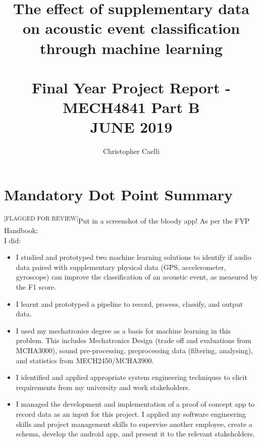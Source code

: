 \documentclass{UoNMCHA}
\newcommand{\flagforreview}{\textsuperscript{\color{red} [FLAGGED FOR REVIEW]}}
\numberwithin{equation}{section}
\begin{document}
\title{The effect of supplementary data on acoustic event classification through machine learning \\ \ \\
{\small Final Year Project Report - MECH4841 Part B  \\JUNE 2019}}
\author[UoNMCHA]{Christopher Caelli}
\address[UoNMCHA]{
Student of Mechatronics Engineering,\\
The University of Newcastle, Callaghan, NSW 2308, AUSTRALIA \\
E-mail: \href{mailto:Christopher.Caelli@uon.edu.au}{\textsf{Christopher.Caelli@uon.edu.au}}}
\maketitle
\onecolumn

\vspace{-5mm}
\section*{Mandatory Dot Point Summary}
\vspace{-3mm}
\flagforreview Put in a screenshot of the bloody app!
As per the FYP Handbook: \\
I did:
\begin{itemize}
    \item I studied and prototyped two machine learning solutions to identify if audio data paired with supplementary physical data (GPS, accelerometer, gyroscope) can improve the classification of an acoustic event, as measured by the F1 score.
    \item I learnt and prototyped a pipeline to record, process, classify, and output data.
    \item I used my mechatronics degree as a basis for machine learning in this problem. This includes Mechatronics Design (trade off and evaluations from MCHA3000), sound pre-processing, preprocessing data (filtering, analysing), and statistics from MECH2450/MCHA3900.
    \item I identified and applied appropriate system engineering techniques to elicit requirements from my university and work stakeholders.
    \item I managed the development and implementation of a proof of concept app to record data as an input for this project. I applied my software engineering skills and project management skills to supervise another employee, create a schema, develop the android app, and present it to the relevant stakeholders.
\end{itemize}
\end{document}
